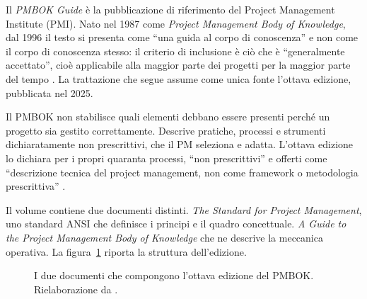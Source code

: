 Il \emph{PMBOK Guide} \`e la pubblicazione di riferimento del Project Management
Institute (PMI). Nato nel 1987 come \emph{Project Management Body of Knowledge},
dal 1996 il testo si presenta come ``una guida al corpo di conoscenza'' e non
come il corpo di conoscenza stesso: il criterio di inclusione \`e ci\`o che \`e
``generalmente accettato'', cio\`e applicabile alla maggior parte dei progetti
per la maggior parte del tempo \cite{pmbok8}. La trattazione che segue assume
come unica fonte l'ottava edizione, pubblicata nel 2025.

Il PMBOK non stabilisce quali
elementi debbano essere presenti perch\'e un progetto sia gestito correttamente.
Descrive pratiche, processi e strumenti dichiaratamente non prescrittivi, che il
PM seleziona e adatta. L'ottava edizione lo dichiara per i propri
quaranta processi, ``non prescrittivi'' e offerti come ``descrizione tecnica del
project management, non come framework o metodologia prescrittiva''
\cite{pmbok8}.

Il volume contiene due documenti distinti. \emph{The Standard for Project
Management}, uno standard ANSI che definisce i principi e il quadro concettuale.
\emph{A Guide to the Project Management Body of Knowledge} che ne descrive la meccanica operativa.
La figura~\ref{fig:pmbok-architettura} riporta la struttura dell'edizione.

\begin{figure}[htbp]
\centering
{}
\caption{I due documenti che compongono l'ottava edizione del PMBOK. Rielaborazione da \cite{pmbok8}.}
\label{fig:pmbok-architettura}
\end{figure}


